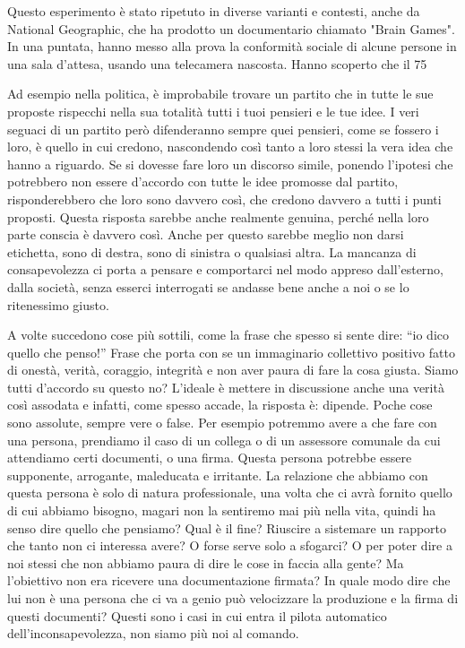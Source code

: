 \documentclass[12pt]{book} %
\begin{document}
Questo esperimento è stato ripetuto in diverse varianti e contesti, anche da National Geographic, che ha prodotto un documentario chiamato "Brain Games". In una puntata, hanno messo alla prova la conformità sociale di alcune persone in una sala d'attesa, usando una telecamera nascosta. Hanno scoperto che il 75%


\bigskip

Ad esempio nella politica, è improbabile trovare un partito che in tutte le sue proposte rispecchi nella sua totalità
tutti i tuoi pensieri e le tue idee. I veri seguaci di un partito però difenderanno sempre quei pensieri, come se
fossero i loro, è quello in cui credono, nascondendo così tanto a loro stessi la vera idea che hanno a riguardo. Se si
dovesse fare loro un discorso simile, ponendo l'ipotesi che potrebbero non essere
d'accordo con tutte le idee promosse dal partito, risponderebbero che loro sono davvero così, che
credono davvero a tutti i punti proposti. Questa risposta sarebbe anche realmente genuina, perché nella loro parte
conscia è davvero così. Anche per questo sarebbe meglio non darsi etichetta, sono di destra, sono di sinistra o
qualsiasi altra. La mancanza di consapevolezza ci porta a pensare e comportarci nel modo appreso
dall'esterno, dalla società, senza esserci interrogati se andasse bene anche a noi o se lo
ritenessimo giusto.


\bigskip

A volte succedono cose più sottili, come la frase che spesso si sente dire: “io dico quello che penso!” Frase che porta
con se un immaginario collettivo positivo fatto di onestà, verità, coraggio, integrità e non aver paura di fare la cosa
giusta. Siamo tutti d'accordo su questo no? L'ideale è mettere in discussione
anche una verità così assodata e infatti, come spesso accade, la risposta è: dipende. Poche cose sono assolute, sempre
vere o false. Per esempio potremmo avere a che fare con una persona, prendiamo il caso di un collega o di un assessore
comunale da cui attendiamo certi documenti, o una firma. Questa persona potrebbe essere supponente, arrogante,
maleducata e irritante. La relazione che abbiamo con questa persona è solo di natura professionale, una volta che ci
avrà fornito quello di cui abbiamo bisogno, magari non la sentiremo mai più nella vita, quindi ha senso dire quello che
pensiamo? Qual è il fine? Riuscire a sistemare un rapporto che tanto non ci interessa avere? O forse serve solo a
sfogarci? O per poter dire a noi stessi che non abbiamo paura di dire le cose in faccia alla gente? Ma
l'obiettivo non era ricevere una documentazione firmata? In quale modo dire che lui non è una
persona che ci va a genio può velocizzare la produzione e la firma di questi documenti? Questi sono i casi in cui entra
il pilota automatico dell'inconsapevolezza, non siamo più noi al comando.
\end{document}
